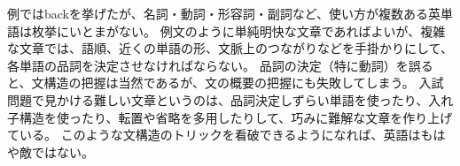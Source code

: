 \documentclass[11pt,a4paper,titlepage]{jsarticle}
\begin{document}
例ではbackを挙げたが、名詞・動詞・形容詞・副詞など、使い方が複数ある英単語は枚挙にいとまがない。
例文のように単純明快な文章であればよいが、複雑な文章では、語順、近くの単語の形、文脈上のつながりなどを手掛かりにして、各単語の品詞を決定させなければならない。
品詞の決定（特に動詞）を誤ると、文構造の把握は当然であるが、文の概要の把握にも失敗してしまう。
入試問題で見かける難しい文章というのは、品詞決定しずらい単語を使ったり、入れ子構造を使ったり、転置や省略を多用したりして、巧みに難解な文章を作り上げている。
このような文構造のトリックを看破できるようになれば、英語はもはや敵ではない。
\end{document}

